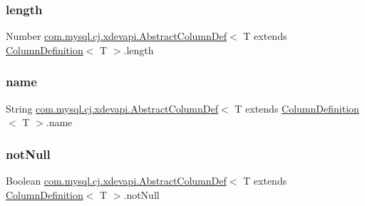 \subsubsection{\texorpdfstring{length}{length}}
{\footnotesize\ttfamily Number \mbox{\hyperlink{classcom_1_1mysql_1_1cj_1_1xdevapi_1_1_abstract_column_def}{com.\+mysql.\+cj.\+xdevapi.\+Abstract\+Column\+Def}}$<$ T extends \mbox{\hyperlink{interfacecom_1_1mysql_1_1cj_1_1protocol_1_1_column_definition}{Column\+Definition}}$<$ T $>$.length\hspace{0.3cm}{\ttfamily [protected]}}

\mbox{\label{classcom_1_1mysql_1_1cj_1_1xdevapi_1_1_abstract_column_def_a4db4c67f053ba22dcaa75459c5fa68c3}} 
\subsubsection{\texorpdfstring{name}{name}}
{\footnotesize\ttfamily String \mbox{\hyperlink{classcom_1_1mysql_1_1cj_1_1xdevapi_1_1_abstract_column_def}{com.\+mysql.\+cj.\+xdevapi.\+Abstract\+Column\+Def}}$<$ T extends \mbox{\hyperlink{interfacecom_1_1mysql_1_1cj_1_1protocol_1_1_column_definition}{Column\+Definition}}$<$ T $>$.name\hspace{0.3cm}{\ttfamily [protected]}}

\mbox{\label{classcom_1_1mysql_1_1cj_1_1xdevapi_1_1_abstract_column_def_abb40ee636a965f01d902673dc919fbba}} 
\subsubsection{\texorpdfstring{not\+Null}{notNull}}
{\footnotesize\ttfamily Boolean \mbox{\hyperlink{classcom_1_1mysql_1_1cj_1_1xdevapi_1_1_abstract_column_def}{com.\+mysql.\+cj.\+xdevapi.\+Abstract\+Column\+Def}}$<$ T extends \mbox{\hyperlink{interfacecom_1_1mysql_1_1cj_1_1protocol_1_1_column_definition}{Column\+Definition}}$<$ T $>$.not\+Null\hspace{0.3cm}{\ttfamily [protected]}}

